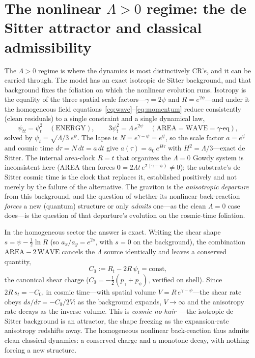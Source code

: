 \documentclass[11pt,a4paper]{article}
\theoremstyle{plain}
\theoremstyle{definition}
\theoremstyle{remark}
\begin{document}
\section{The nonlinear $\Lambda>0$ regime: the de Sitter attractor and classical admissibility}\label{sec:nonlinear}

The $\Lambda>0$ regime is where the dynamics is most distinctively CR's, and it can be carried through. The model has an exact isotropic de Sitter background, and that background fixes the foliation on which the nonlinear evolution runs. Isotropy is the equality of the three spatial scale factors---$\gamma=2\psi$ and $R=e^{2\psi}$---and under it the homogeneous field equations~\eqref{eq:wave}--\eqref{eq:momentum} reduce consistently (clean residuals) to a single constraint and a single dynamical law,
\begin{equation}
\psi_{tt}=\psi_t^2\quad(\text{ENERGY}),\qquad 3\psi_t^2=\Lambda\,e^{2\psi}\quad(\text{AREA}=\text{WAVE}=\gamma\text{-eq}),
\end{equation}
solved by $\psi_t=\sqrt{\Lambda/3}\,e^{\psi}$. The lapse is $N=e^{\gamma-\psi}=e^{\psi}$, so the scale factor $a=e^{\psi}$ and cosmic time $d\tau=N\,dt=a\,dt$ give $a(\tau)=a_0\,e^{H\tau}$ with $H^2=\Lambda/3$---exact de Sitter. The internal area-clock $R=t$ that organizes the $\Lambda=0$ Gowdy system is inconsistent here (AREA then forces $0=2\Lambda t\,e^{2(\gamma-\psi)}\neq0$); the substrate's de Sitter cosmic time is the clock that replaces it, established positively and not merely by the failure of the alternative. The graviton is the \emph{anisotropic departure} from this background, and the question of whether its nonlinear back-reaction \emph{forces} a new (quantum) structure or only \emph{admits} one---as the clean $\Lambda=0$ case does---is the question of that departure's evolution on the cosmic-time foliation.

In the homogeneous sector the answer is exact. Writing the shear shape $s=\psi-\tfrac12\ln R$ (so $a_x/a_y=e^{2s}$, with $s=0$ on the background), the combination $\text{AREA}-2\,\text{WAVE}$ cancels the $\Lambda$ source identically and leaves a conserved quantity,
\begin{equation}
C_0:=R_t-2R\,\psi_t=\text{const},
\end{equation}
the canonical shear charge ($C_0=-\tfrac12(p_\gamma+p_\psi)$, verified on shell). Since $2R\,s_t=-C_0$, in cosmic time---with spatial volume $V=R\,e^{\gamma-\psi}$---the shear rate obeys $ds/d\tau=-C_0/2V$: as the background expands, $V\to\infty$ and the anisotropy rate decays as the inverse volume. This is \emph{cosmic no-hair}~\cite{Wald1983}---the isotropic de Sitter background is an attractor, the shape freezing as the expansion-rate anisotropy redshifts away. The homogeneous nonlinear back-reaction thus admits clean classical dynamics: a conserved charge and a monotone decay, with nothing forcing a new structure.
\end{document}
